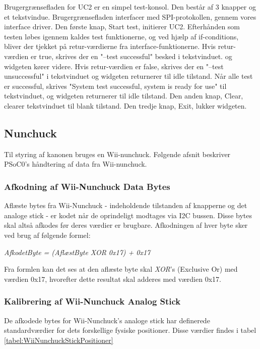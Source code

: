 Brugergrænsefladen for UC2 er en simpel test-konsol. Den består af 3 knapper og et tekstvindue. Brugergrænsefladen interfacer med SPI-protokollen, gennem vores interface driver. Den første knap, Start test, initierer UC2. Efterhånden som testen løbes igennem kaldes test funktionerne, og ved hjælp af if-conditions, bliver der tjekket på retur-værdierne fra interface-funktionerne. Hvis retur-værdien er true, skrives der en "--test successful" besked i tekstvinduet. og widgeten kører videre. Hvis retur-værdien er false, skrives der en "--test unsuccessful" i tekstvinduet og widgeten returnerer til idle tilstand. Når alle test er successful, skrives "System test successful, system is ready for use" til tekstvinduet, og widgeten returnerer til idle tilstand. Den anden knap, Clear, clearer tekstvinduet til blank tilstand. Den tredje knap, Exit, lukker widgeten.

\subsection{Nunchuck}
Til styring af kanonen bruges en Wii-nunchuck. Følgende afsnit beskriver PSoC0's håndtering af data fra Wii-nunchuck.

\subsubsection{Afkodning af Wii-Nunchuck Data Bytes}
Aflæste bytes fra Wii-Nunchuck - indeholdende tilstanden af knapperne og det analoge stick - er kodet når de oprindeligt modtages via I2C bussen. Disse bytes skal altså afkodes før deres værdier er brugbare. Afkodningen af hver byte sker ved brug af følgende formel:

\textit{AfkodetByte = (AflæstByte XOR 0x17) + 0x17}

Fra formlen kan det ses at den aflæste byte skal \textit{XOR}'s (Exclusive Or) med værdien 0x17, hvorefter dette resultat skal adderes med værdien 0x17.

\subsubsection{Kalibrering af Wii-Nunchuck Analog Stick}
De afkodede bytes for Wii-Nunchuck's analoge stick har definerede standardværdier for dets forskellige fysiske positioner. Disse værdier findes i tabel \ref{tabel:WiiNunchuckStickPositioner}

